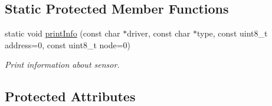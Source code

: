 \subsection*{Static Protected Member Functions}
\begin{DoxyCompactItemize}
\item 
static void \hyperlink{classSensorDriver_acaeaeab0b4536073c812bf53582a9e08}{print\+Info} (const char $\ast$driver, const char $\ast$type, const uint8\+\_\+t address=0, const uint8\+\_\+t node=0)
\begin{DoxyCompactList}\small\item\em Print information about sensor. \end{DoxyCompactList}\end{DoxyCompactItemize}
\subsection*{Protected Attributes}
